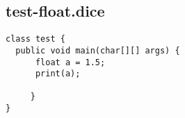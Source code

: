 \subsection{test-float.dice}
\begin{verbatim}
class test {
  public void main(char[][] args) {
      float a = 1.5;
      print(a);

     }
}
\end{verbatim}